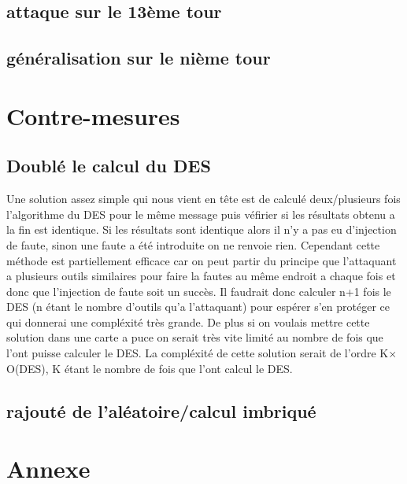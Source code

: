 \documentclass[a4paper]{report}
\begin{document}
			\section{attaque sur le 13ème tour}
			\section{généralisation sur le nième tour}
		
		\chapter{Contre-mesures}
			\section{Doublé le calcul du DES}
				Une solution assez simple qui nous vient en tête est de calculé deux/plusieurs fois l'algorithme du DES pour le même message puis véfirier si les résultats obtenu a la fin est
				identique.
				Si les résultats sont identique alors il n'y a pas eu d'injection de faute, sinon une faute a été introduite on ne renvoie rien.
				Cependant cette méthode est partiellement efficace car on peut partir du principe que l'attaquant a plusieurs outils similaires pour faire la fautes au même endroit a chaque fois et 
				donc que l'injection de faute soit un succès. 
				Il faudrait donc calculer n+1 fois le DES (n étant le nombre d'outils qu'a l'attaquant) pour espérer s'en protéger ce qui donnerai une compléxité très grande. 
				De plus si on voulais mettre cette solution dans une carte a puce on serait très vite limité au nombre de fois que l'ont puisse calculer le DES.
				La compléxité de cette solution serait de l'ordre K$\times$O(DES), K étant le nombre de fois que l'ont calcul le DES.
			
			\section{rajouté de l'aléatoire/calcul imbriqué}
		
		\chapter{Annexe}


		
\end{document}
